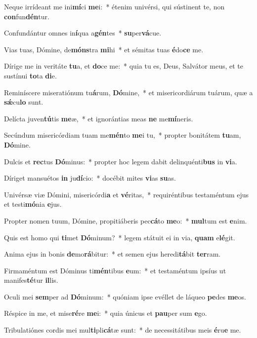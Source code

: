 \item Neque irrídeant me ini\textbf{mí}ci \textbf{me}i:~* étenim univérsi, qui sústinent te, non \textbf{con}fun\textbf{dén}tur.
\item Confundántur omnes in\textbf{í}qua a\textbf{gén}tes~* \textbf{su}per\textbf{vá}cue.
\item Vias tuas, Dómine, de\textbf{móns}tra \textbf{mi}hi~* et sémitas tuas \textbf{é}do\textbf{ce} me.
\item Dírige me in veritáte \textbf{tu}a, et \textbf{do}ce me:~* quia tu es, Deus, Salvátor meus, et te sustínui \textbf{to}ta \textbf{di}e.
\item Reminíscere miseratiónum tu\textbf{á}rum, \textbf{Dó}mine,~* et misericordiárum tuárum, quæ a \textbf{sǽ}cu\textbf{lo} sunt.
\item Delícta juven\textbf{tú}tis \textbf{me}æ,~* et ignorántias meas \textbf{ne} me\textbf{mí}neris.
\item Secúndum misericórdiam tuam me\textbf{mén}to \textbf{me}i tu,~* propter bonitátem \textbf{tu}am, \textbf{Dó}mine.
\item Dulcis et \textbf{rec}tus \textbf{Dó}minus:~* propter hoc legem dabit delinquénti\textbf{bus} in \textbf{vi}a.
\item Díriget mansuétos \textbf{in} ju\textbf{dí}cio:~* docébit mites \textbf{vi}as \textbf{su}as.
\item Univérsæ viæ Dómini, misericórdi\textbf{a} et \textbf{vé}ritas,~* requiréntibus testaméntum ejus et testi\textbf{mó}nia \textbf{e}jus.
\item Propter nomen tuum, Dómine, propitiáberis pec\textbf{cá}to \textbf{me}o:~* \textbf{mul}tum est \textbf{e}nim.
\item Quis est homo qui \textbf{ti}met \textbf{Dó}minum?~* legem státuit ei in via, \textbf{quam} e\textbf{lé}git.
\item Anima ejus in bonis \textbf{de}mo\textbf{rá}bitur:~* et semen ejus heredi\textbf{tá}bit \textbf{ter}ram.
\item Firmaméntum est Dóminus ti\textbf{mén}tibus \textbf{e}um:~* et testaméntum ipsíus ut manifes\textbf{té}tur \textbf{il}lis.
\item Oculi mei \textbf{sem}per ad \textbf{Dó}minum:~* quóniam ipse evéllet de láqueo \textbf{pe}des \textbf{me}os.
\item Réspice in me, et mise\textbf{ré}re \textbf{me}i:~* quia únicus et \textbf{pau}per sum \textbf{e}go.
\item Tribulatiónes cordis mei mul\textbf{ti}pli\textbf{cá}tæ sunt:~* de necessitátibus meis \textbf{é}ru\textbf{e} me.
